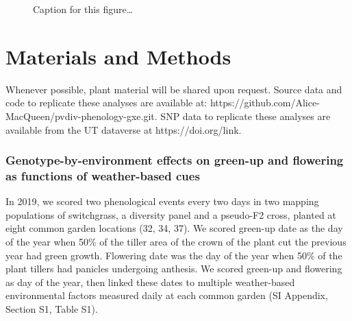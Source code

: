 \documentclass[
  9pt,
  twocolumn,
  twoside]{pnas-new}
\begin{document}
\begin{figure}


\caption{\label{fig-covar}Caption for this figure\ldots{}}

\end{figure}%

\section{Materials and Methods}\label{materials-and-methods}

Whenever possible, plant material will be shared upon request. Source
data and code to replicate these analyses are available at:
https://github.com/Alice-MacQueen/pvdiv-phenology-gxe.git. SNP data to
replicate these analyses are available from the UT dataverse at
https://doi.org/link.

\subsubsection{Genotype-by-environment effects on green-up and flowering
as functions of weather-based
cues}\label{genotype-by-environment-effects-on-green-up-and-flowering-as-functions-of-weather-based-cues}

In 2019, we scored two phenological events every two days in two mapping
populations of switchgrass, a diversity panel and a pseudo-F2 cross,
planted at eight common garden locations (32, 34, 37). We scored
green-up date as the day of the year when 50\% of the tiller area of the
crown of the plant cut the previous year had green growth. Flowering
date was the day of the year when 50\% of the plant tillers had panicles
undergoing anthesis. We scored green-up and flowering as day of the
year, then linked these dates to multiple weather-based environmental
factors measured daily at each common garden (SI Appendix, Section S1,
Table S1).
\end{document}
